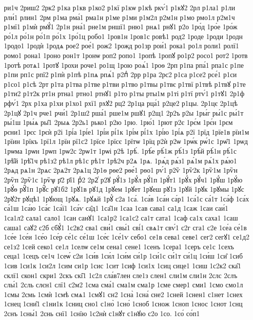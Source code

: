 {ри1ч
2риш2
2рк2
р1ка
р1кв
р1ко2
р1кї
р1кѡ
р1кѣ
ркѵ́1
р1кꙋ2
2рл
р1ла1
р1ли
рли́1
рлин1
2рм
р1ма
рма́1
рма1н
р1ме
р1ми
р1м2л
р2м1н
р1мо
рмо1л
р2м1ч
р1мї1
р1мѝ
рмꙋ́1
2р1н
рна́1
рне1м
рншї1
рню1
рнѧ1
рнꙋ1
р2о
1ро́д
1ро́е
1ро́ж
ро́1л
ро́1н
ро́1п
ро́1х
1ро́1ц
робо1
1ров1н
1ров1с
ровѣ1
род2
1роде
1роди
1родн
1родо1
1родѝ
1родѧ
рое2
рое́1
рож2
1рожд
ро1зр
рои́1
рока1
ро1л
роли1
ролї1
ромо1
рона1
1роно
рон1т
1ронѡ
роп2
ропо1
1ропѣ
1ропꙋ
ро1р2
росо1
рот2
1ротв
1ротѣ
ротѧ1
1ротꙋ
1рохи
роче1
ро1щ
1рою
роѧ́1
1роѳ
2рп
р1па
рпа́1
рпа1с
р1пе
р1пи
рп1с
рпї2
р1пѝ
р1пѣ
р1пѧ
рпѧ́1
р2пⷣ
2рр
р1ра
2рс2
р1са
р1се2
рсе́1
р1си
р1со1
р1сѣ
2рт
р1та
р1тва
р1тве
р1тви
р1тво
р1твы
р1твє
р1твї
р1твѣ
р1твꙋ
р1те
р1ти2
р1т2к
рт1н
ртна1
ртно1
ртнꙋ1
р1то
р1ты
рты1м
р1ті
р1тї
ртѵ́1
р1тꙋ1
2р1ф
рфѵ́1
2рх
р1ха
р1хи
р1хо1
рхї1
рхꙋ2
рц2
2р1ца
рца́1
р2це2
р1цы.
2р1цє
2р1цѣ
2р1цꙋ
2р1ч
рче1
рчи́1
2р1ш2
рша́1
рше1м
ршꙋ1
р2щ1
2р2ъ
р2ы
1ры́г
ры́1с
ры́1т
ры́1ш
1ры́ѧ
ры̑1
2рыѧ
2р2ь1
рько1
р2ю
1рю.
1рю́1
1рют
р2є
1рє́м
1рє́н
1рєм
рєни1
1рєс
1рєѝ
р2і
1рі́а
1рі́е1
1рі́и
рі́1к
1рі́м
рі́1х
1рі́ю
1рі́ѧ
р2ї
1рїд
1рїе1в
рїи1м
1рїин
1рїкъ
1рї1л
1рїн
рї1с2
1рїсе
1рїсє
1рїтѡ
1рїц
р2ѝ
р2ѡ
1рѡ́к
рѡ́1с
1рѡ̑1
1рѡд
1рѡма
1рѡн
1рѡп
1рѡ2с
2рѡ1т
1рѡі
р2ѣ
1рѣ́.
1рѣ́е
рѣ́1ж
рѣ́1з
1рѣ́й
рѣ́1н
рѣ́1с
1рѣ̑й
1рѣ̑1ч
рѣ1з2
рѣ1л
рѣ1с
рѣ1т
1рѣ2ч
р2ѧ
1рѧ.
1рѧ́д
рѧ́з1
рѧ́1м
рѧ́1х
рѧ́ю1
2рѧд
рѧ1н
2рѧс
2рѧ2т
2рѧ1ц
2р1ѳ
рѳе2
рѳе́1
рѳо1
рѵ́1
р2ѷ
1рѷ2к
1рѷ1м
1рѷн
2рѷп
2рѷ1с
1рѷѱ
р҃2
р҃ї1
рⷣ2
2р2ⷭ
р2ꙋ
рꙋ́1з
1рꙋ́л
рꙋ́1п
1рꙋ́т1
1рꙋ́х
рꙋ́ч1
1рꙋ́ш
1рꙋ́ю
1рꙋ́ѳ
рꙋ̑1п
1рꙋ̑с
рꙋ1б2
1рꙋ1в
рꙋ1д
1рꙋем
1рꙋет
1рꙋеш
рꙋ1з
1рꙋй
1рꙋк
1рꙋмы
1рꙋс
2рꙋ2т
рꙋцѣ1
1рꙋющ
1рꙋѧ.
1рꙋѧй
1рꙋⷯ
с2а
1са́.
1са́в
1са́н
са́р1
1са́1с
са́1т
1са́ф
1са́х
са́1ш
1са́ю
1са́є
1са́ї1
1са́ѵ
са̑д1
1са̑1н
1саа
1сав
сава1
са1д
1саж
1саи
саи́1
1са1л2
сала1
сало1
1сан
санꙋ1
1са1р2
1са1с2
са1т
сата1
1саф
са1х
саха1
1саш
саша1
саꙋ2
с2б
сбꙋ́1
1с2в2
сва1
сви́1
свы́1
сві́1
свѧ1т
свѵ́1
с2г
сга1
с2е
1се́а
се́1в
1се́е
1се́и
1се́о
1се́р
се́1с
се́1ш
1се́є
1се́1ѵ
себо1
се1в
сева1
севе1
сег2
сегꙋ1
се1д2
се1з2
1сей
секо1
се1л
1селѡ
се1м
сена1
сене1
1сенъ
1сера1
1серъ
се1с
1сехъ
сеца1
1сецъ
се1ч
1сеѡ́
с2и
1си́в
1си́л
1си́м
си́1р
1си́1с
си́1т
си́1ц
1си́ш
1си̑
1сиб
1сив
1си1к
1си2л
1сим
си1р
1сис
1сит
1сиф
1си1х
1сиц
сице1
1сиш
1с2к2
ска̑1
склї1
скон1
скри1
2скъ
скі̑1
1с2л
сла́в7лен
сле1з
слен1
сли1м
сли1н
2слс
2слъ
слы́1
2сль
слєн1
слї1
с2м2
1сма
сма́1
сма1м
сма1р
1сме
смер1
сми1
1смо
смо1л
1смы
2смь
1смѝ
1смѣ
смѧ1
1смꙋ1
сн2
1сна̀
1сна́
сне2
1сней
1снен1
с1нет
1снех
1снец
1сни̑1
с1ни1к
1сниц
сно1
с1но̀
1сно́
1сноб
1снож
1сноп
1снос
1снот
1снц
2снъ
1сны́1
2снь
снї1
1снїю
1с2нѝ
с1нꙋт
с1нꙋю
с2о
1со.
1со́
со́п1
}
